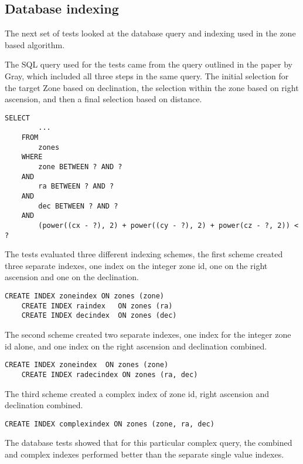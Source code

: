 \documentclass{article}
\begin{document}
\subsection{Database indexing}
\label{database-indexing}

The next set of tests looked at the database query and indexing used in the zone based algorithm.

The SQL query used for the tests came from the query outlined in the paper by Gray, which included all three steps in the same query. The initial selection for the target Zone based on declination, the selection within the zone based on right ascension, and then a final selection based on distance.

\begin{lstlisting}[style=SQL]
    SELECT
        ...
    FROM
        zones
    WHERE
        zone BETWEEN ? AND ?
    AND
        ra BETWEEN ? AND ?
    AND
        dec BETWEEN ? AND ?
    AND
        (power((cx - ?), 2) + power((cy - ?), 2) + power(cz - ?, 2)) < ?
\end{lstlisting}

The tests evaluated three different indexing schemes, the first scheme created three separate indexes, one index on the integer zone id, one on the right ascension and one on the declination.

\begin{lstlisting}[style=SQL]
    CREATE INDEX zoneindex ON zones (zone)
    CREATE INDEX raindex   ON zones (ra)
    CREATE INDEX decindex  ON zones (dec)
\end{lstlisting}

The second scheme created two separate indexes, one index for the integer zone id alone, and one index on the right ascension and declination combined.

\begin{lstlisting}[style=SQL]
    CREATE INDEX zoneindex  ON zones (zone)
    CREATE INDEX radecindex ON zones (ra, dec)
\end{lstlisting}

The third scheme created a complex index of zone id, right ascension and declination combined.

\begin{lstlisting}[style=SQL]
    CREATE INDEX complexindex ON zones (zone, ra, dec)
\end{lstlisting}

The database tests showed that for this particular complex query, the combined and complex indexes performed better than the separate single value indexes.
\end{document}
